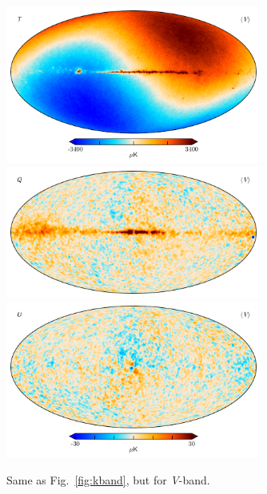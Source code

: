 \documentclass[twocolumn]{../../common/aa}
\newcommand{\V}[0]{\textit V}
\begin{document}
\begin{figure}
	\centering
	\includegraphics[width=0.75\textwidth]{figures/V_mu_I.pdf}
	\includegraphics[width=0.75\textwidth]{figures/V_mu_Q.pdf}
	\includegraphics[width=0.75\textwidth]{figures/V_mu_U.pdf}
        \caption{Same as Fig.~\ref{fig:kband}, but for \V-band.}        
	\label{fig:vband}
\end{figure}
\end{document}
